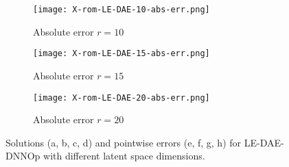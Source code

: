\begin{figure}[!htb]
\begin{center}
        \begin{subfigure}[b]{0.23\textwidth}
            \begin{center}
                \texttt{[image: X-rom-LE-DAE-10-abs-err.png]}
            \end{center}
            \caption{Absolute error $r = 10$}
        \end{subfigure}   
        \begin{subfigure}[b]{0.23\textwidth}
            \begin{center}
                \texttt{[image: X-rom-LE-DAE-15-abs-err.png]}
            \end{center}
            \caption{Absolute error $r = 15$}
        \end{subfigure}    
        \begin{subfigure}[b]{0.23\textwidth}
            \begin{center}
                \texttt{[image: X-rom-LE-DAE-20-abs-err.png]}
            \end{center}
            \caption{Absolute error $r = 20$}
        \end{subfigure}
     \end{center}
     \caption[Solutions and pointwise errors for LE-DAE-DNNOp.]{Solutions (a, b, c, d) and pointwise errors (e, f, g, h) for LE-DAE-DNNOp with different latent space dimensions.}
        \label{fig: ledae-burger}
\end{figure}

